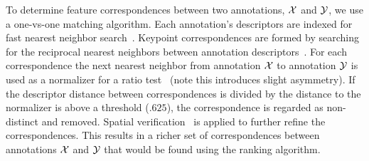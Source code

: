 To determine feature correspondences between two annotations, $\mathcal{X}$ and $\mathcal{Y}$, we
  use a one-vs-one matching algorithm.
Each annotation's descriptors are indexed for fast nearest neighbor
  search~\cite{muja_fast_2009}.
Keypoint correspondences are formed by searching for the reciprocal nearest
  neighbors between annotation descriptors~\cite{qin_hello_2011}.
For each correspondence the next nearest neighbor from annotation $\mathcal{X}$ to
  annotation $\mathcal{Y}$ is used as a normalizer for a ratio
  test~\cite{lowe_distinctive_2004} (note this introduces slight asymmetry).
If the descriptor distance between correspondences is divided by the distance
  to the normalizer is above a threshold ($.625$), the correspondence is
  regarded as non-distinct and removed.
Spatial verification~\cite{philbin_object_2007} is applied to further refine
  the correspondences.
This results in a richer set of correspondences between annotations $\mathcal{X}$ and
  $\mathcal{Y}$ that would be found using the ranking algorithm.

